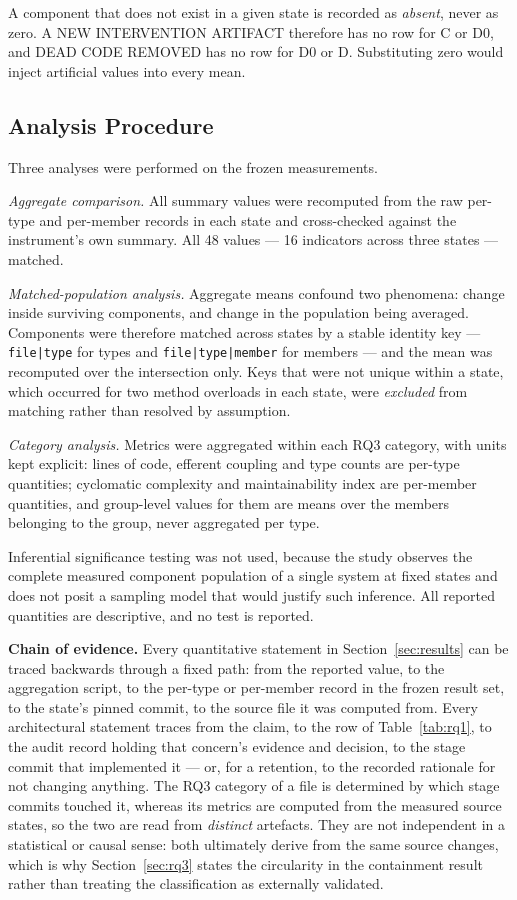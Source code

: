 \documentclass{sbc2019}%
\begin{document}
A component that does not exist in a given state is recorded as \emph{absent},
never as zero. A NEW INTERVENTION ARTIFACT therefore has no row for C or D0, and
DEAD CODE REMOVED has no row for D0 or D. Substituting zero would inject
artificial values into every mean.

\subsection{Analysis Procedure}

Three analyses were performed on the frozen measurements.

\emph{Aggregate comparison.} All summary values were recomputed from the raw
per-type and per-member records in each state and cross-checked against the
instrument's own summary. All 48 values --- 16 indicators across three states ---
matched.

\emph{Matched-population analysis.} Aggregate means confound two phenomena:
change inside surviving components, and change in the population being averaged.
Components were therefore matched across states by a stable identity key ---
\texttt{file|type} for types and \texttt{file|type|member} for members --- and
the mean was recomputed over the intersection only. Keys that were not unique
within a state, which occurred for two method overloads in each state, were
\emph{excluded} from matching rather than resolved by assumption.

\emph{Category analysis.} Metrics were aggregated within each RQ3 category, with
units kept explicit: lines of code, efferent coupling and type counts are
per-type quantities; cyclomatic complexity and maintainability index are
per-member quantities, and group-level values for them are means over the
members belonging to the group, never aggregated per type.

Inferential significance testing was not used, because the study observes the
complete measured component population of a single system at fixed states and
does not posit a sampling model that would justify such inference. All reported
quantities are descriptive, and no test is reported.

\medskip\noindent\textbf{Chain of evidence.} Every quantitative statement in
Section~\ref{sec:results} can be traced backwards through a fixed path: from the
reported value, to the aggregation script, to the per-type or per-member record
in the frozen result set, to the state's pinned commit, to the source file it was
computed from. Every architectural statement traces from the claim, to the row of
Table~\ref{tab:rq1}, to the audit record holding that concern's evidence and
decision, to the stage commit that implemented it --- or, for a retention, to the
recorded rationale for not changing anything. The RQ3 category of a file is
determined by which stage commits touched it, whereas its metrics are computed
from the measured source states, so the two are read from \emph{distinct}
artefacts. They are not independent in a statistical or causal sense: both
ultimately derive from the same source changes, which is why
Section~\ref{sec:rq3} states the circularity in the containment result rather
than treating the classification as externally validated.
\end{document}
